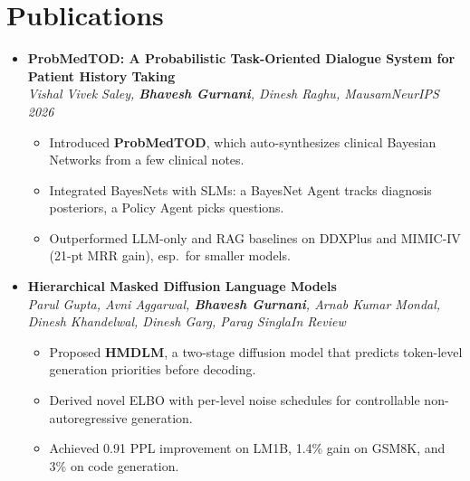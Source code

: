 \documentclass[10pt,letterpaper]{article}
\newcommand{\dates}[1]{\hfill{\color{dateblue}\itshape #1}}
\begin{document}
\section{Publications}
\begin{itemize}
  \item \textbf{ProbMedTOD: A Probabilistic Task-Oriented Dialogue System for Patient History Taking}\\
  {\footnotesize\textit{Vishal Vivek Saley, \textbf{Bhavesh Gurnani}, Dinesh Raghu, Mausam}}\dates{NeurIPS 2026}
  \begin{itemize}
    \item Introduced \textbf{ProbMedTOD}, which auto-synthesizes clinical Bayesian Networks from a few clinical notes.
    \item Integrated BayesNets with SLMs: a BayesNet Agent tracks diagnosis posteriors, a Policy Agent picks questions.
    \item Outperformed LLM-only and RAG baselines on DDXPlus and MIMIC-IV (21-pt MRR gain), esp.\ for smaller models.
  \end{itemize}
  \item \textbf{Hierarchical Masked Diffusion Language Models}\\
  {\footnotesize\textit{Parul Gupta, Avni Aggarwal, \textbf{Bhavesh Gurnani}, Arnab Kumar Mondal, Dinesh Khandelwal, Dinesh Garg, Parag Singla}}\dates{In Review}
  \begin{itemize}
    \item Proposed \textbf{HMDLM}, a two-stage diffusion model that predicts token-level generation priorities before decoding.
    \item Derived novel ELBO with per-level noise schedules for controllable non-autoregressive generation.
    \item Achieved 0.91 PPL improvement on LM1B, 1.4\% gain on GSM8K, and 3\% on code generation.
  \end{itemize}
\end{itemize}
\end{document}
